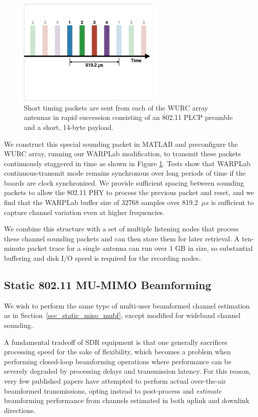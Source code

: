 	\begin{figure}[htb]
\centering
  \includegraphics[width=2.7in]{figs/ryan_sounding_example}   
    \caption{Short timing packets are sent from each of the \ac{WURC} array antennas in rapid succession consisting of an 802.11 PLCP preamble and a short, 14-byte payload.}\label{fig:sounding}
\end{figure}

	We construct this special sounding packet in MATLAB and preconfigure the \ac{WURC} array, running our WARPLab modification, to transmit these packets continuously staggered in time as shown in Figure \ref{fig:sounding}.
	Tests show that WARPLab continuous-transmit mode remains synchronous over long periods of time if the boards are clock synchronized.
	We provide sufficient spacing between sounding packets to allow the 802.11 PHY to process the previous packet and reset, and we find that the WARPLab buffer size of 32768 samples over 819.2~$\mu s$ is sufficient to capture channel variation even at higher frequencies.

We combine this structure with a set of multiple listening nodes that process these channel sounding packets and can then store them for later retrieval.
A ten-minute packet trace for a single antenna can run over 1 GB in size, so substantial buffering and disk I/O speed is required for the recording nodes.
	
\subsection{Static 802.11 MU-MIMO Beamforming}
\label{sec_static_beamforming}

	We wish to perform the same type of multi-user beamformed channel estimation as in Section~\ref{sec_static_miso_mubf}, except modified for wideband channel sounding.

	A fundamental tradeoff of \ac{SDR} equipment is that one generally sacrifices processing speed for the sake of flexibility, which becomes a problem when performing closed-loop beamforming operations where performance can be severely degraded by processing delays and transmission latency.
	For this reason, very few published papers have attempted to perform actual over-the-air beamformed transmissions, opting instead to post-process and \emph{estimate} beamforming performance from channels estimated in both uplink and downlink directions.

